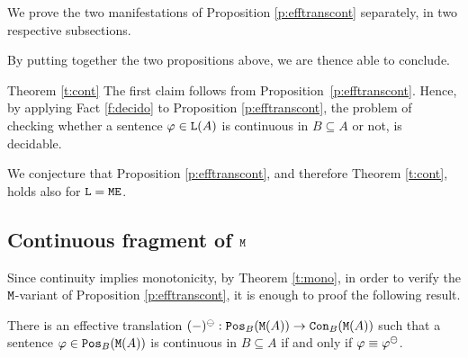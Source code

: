 We prove the two manifestations of Proposition \ref{p:efftranscont} separately,
in two respective subsections.

By putting together the two propositions above, we are thence able to conclude.
\begin{proofof}{Theorem \ref{t:cont}}
The first claim follows from  Proposition~\ref{p:efftranscont}. 
Hence, by applying Fact \ref{f:decido} to Proposition \ref{p:efftranscont}, the 
problem of checking whether a sentence $\phi \in \llang(A)$ is continuous in 
$B \subseteq A$ or not, is decidable.
\end{proofof}

We conjecture that Proposition \ref{p:efftranscont}, and therefore
Theorem \ref{t:cont}, holds also for $\llang=\ofoe$.

\subsection{Continuous fragment of $\ofo$}\label{subsec:conofo}

Since continuity implies monotonicity, by Theorem \ref{t:mono}, in order to 
verify the $\ofo$-variant of Proposition \ref{p:efftranscont}, it is enough to
proof the following result.

\begin{proposition}\label{prop:ofocont}
There is an effective translation $(-)^\tcont:\monot{\ofo(A)}{B} \to 
\cont{\ofo(A)}{B}$ such that a sentence $\phi \in \monot{\ofo(A)}{B}$ is
continuous in $B \subseteq A$ if and only if $\phi\equiv \phi^\tcont$.
\end{proposition}

